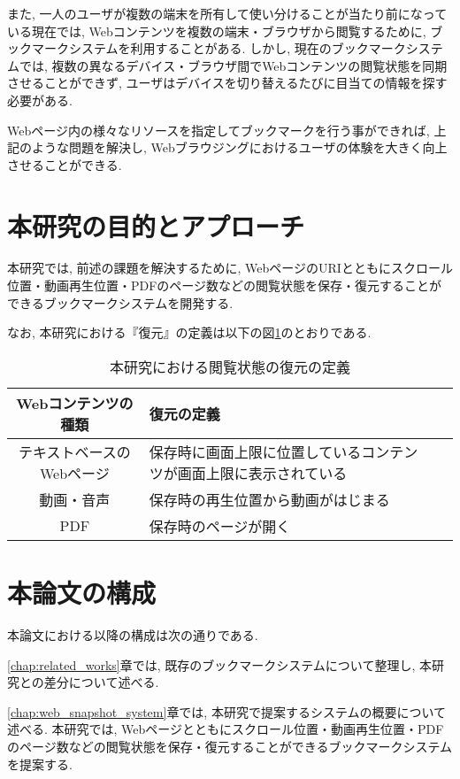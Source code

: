 また, 一人のユーザが複数の端末を所有して使い分けることが当たり前になっている現在では, Webコンテンツを複数の端末・ブラウザから閲覧するために, ブックマークシステムを利用することがある.
しかし, 現在のブックマークシステムでは, 複数の異なるデバイス・ブラウザ間でWebコンテンツの閲覧状態を同期させることができず, ユーザはデバイスを切り替えるたびに目当ての情報を探す必要がある.

Webページ内の様々なリソースを指定してブックマークを行う事ができれば, 上記のような問題を解決し, Webブラウジングにおけるユーザの体験を大きく向上させることができる.

\section{本研究の目的とアプローチ}
本研究では, 前述の課題を解決するために, WebページのURIとともにスクロール位置・動画再生位置・PDFのページ数などの閲覧状態を保存・復元することができるブックマークシステムを開発する.

なお, 本研究における『復元』の定義は以下の図\ref{tb:restore-definition}のとおりである.

\begin{table}[htbp]
  \begin{center}
    \caption{本研究における閲覧状態の復元の定義}
    \label{tb:restore-definition}
    \begin{tabular}{|c|l|l|}
      \hline
      Webコンテンツの種類 & 復元の定義 \\\hline\hline
      テキストベースのWebページ & 保存時に画面上限に位置しているコンテンツが画面上限に表示されている \\\hline
      動画・音声 & 保存時の再生位置から動画がはじまる \\\hline
      PDF & 保存時のページが開く \\\hline
    \end{tabular}
  \end{center}
\end{table}

\section{本論文の構成}

本論文における以降の構成は次の通りである.

\ref{chap:related_works}章では, 既存のブックマークシステムについて整理し, 本研究との差分について述べる.

\ref{chap:web_snapshot_system}章では, 本研究で提案するシステムの概要について述べる.
本研究では, Webページとともにスクロール位置・動画再生位置・PDFのページ数などの閲覧状態を保存・復元することができるブックマークシステムを提案する.

